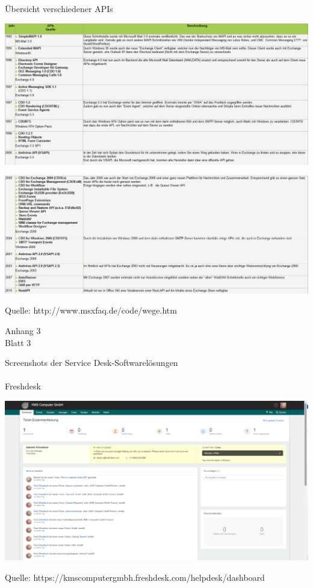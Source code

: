 \noindent Übersicht verschiedener APIs
\begin{flushleft}
\includegraphics[width=1.0\textwidth]{Abbildungen/API_1.png}
\end{flushleft}
\label{API_1}
\begin{flushleft}
\includegraphics[width=1.0\textwidth]{Abbildungen/API_2.png}
\end{flushleft}
\noindent Quelle: http://www.msxfaq.de/code/wege.htm

\newpage

\begin{flushright}
Anhang 3\\
Blatt 3\\
\label{Anhang3}
\end{flushright}

\noindent Screenshots der Service Desk-Softwarelösungen \\\\
\noindent Freshdesk
\begin{flushleft}
\includegraphics[width=1.0\textwidth]{Abbildungen/Freshdesk.png}
\end{flushleft}
\noindent Quelle: https://kmscomputergmbh.freshdesk.com/helpdesk/dashboard \\\\

